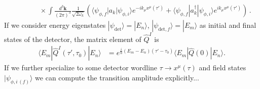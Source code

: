 \documentclass[../QFT_main.tex]{subfiles}
\begin{document}
\begin{mytheorem}
{\begin{align}
    &\quad\qquad\times \int \frac{d^3\mathbf{k}}{(2\pi)^3} \frac{1}{\sqrt{2\omega_k}} \left(\langle \psi_{\phi,f} | a_k| \psi_{\phi,i}\rangle  e^{-i k_\mu x^\mu(\tau')} + \langle \psi_{\phi,f} | a_k^\dagger| \psi_{\phi,i}\rangle e^{i k_\mu x^\mu(\tau')} \right)\,.
\end{align}
}
If we consider energy eigenstates $|\psi_{\mathrm{det}}\rangle = |E_n \rangle$, $|\psi_{\mathrm{det},f}\rangle = |E_m \rangle$ as initial and final states of the detector, the matrix element of $\hat{Q}^I$ is
\begin{align}
    \langle E_m | \hat{Q}^I(\tau',\tau_0) | E_n \rangle &= e^{\frac{i}{\hbar} (E_m - E_n)(\tau'-\tau_0)} \langle E_m | \hat{Q}(0) | E_n \rangle.
\end{align}
If we further specialize to some detector wordline $\tau \to x^\mu(\tau)$ and field states $|\psi_{\phi,i\,(f)}\rangle$ we can compute the transition amplitude explicitly...
\medskip


\end{mytheorem}
\end{document}
